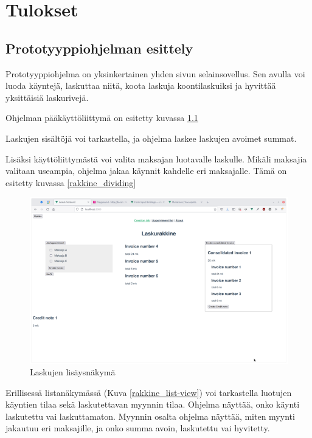 \hypertarget{tulokset}{%
\chapter{Tulokset}\label{tulokset}}

\hypertarget{prototyyppiohjelman-esittely}{%
\section{Prototyyppiohjelman
esittely}\label{prototyyppiohjelman-esittely}}

Prototyyppiohjelma on yksinkertainen yhden sivun selainsovellus. Sen
avulla voi luoda käyntejä, laskuttaa niitä, koota laskuja
koontilaskuiksi ja hyvittää yksittäisiä laskurivejä.

Ohjelman pääkäyttöliittymä on esitetty kuvassa
\ref{rakkine_default-view}

Laskujen sisältöjä voi tarkastella, ja ohjelma laskee laskujen avoimet
summat.

Lisäksi käyttöliittymästä voi valita maksajan luotavalle laskulle.
Mikäli maksajia valitaan useampia, ohjelma jakaa käynnit kahdelle eri
maksajalle. Tämä on esitetty kuvassa \ref{rakkine_dividing}

\begin{figure}
\centering
\includegraphics{illustration/screenshots/Laskurakkine.png}
\caption{\label{rakkine_default-view}Laskujen lisäysnäkymä}
\end{figure}

Erillisessä listanäkymässä (Kuva \ref{rakkine_list-view}) voi
tarkastella luotujen käyntien tilaa sekä laskutettavan myynnin tilaa.
Ohjelma näyttää, onko käynti laskutettu vai laskuttamaton. Myynnin
osalta ohjelma näyttää, miten myynti jakautuu eri maksajille, ja onko
summa avoin, laskutettu vai hyvitetty.

